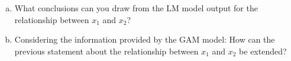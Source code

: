{\begin{enumerate}[a)]
	\item
    What conclusions can you draw from the LM model output for the relationship between $x_1$ and $x_2$? 
    
	\item
    Considering the information provided by the GAM model: How can the previous statement about the relationship between $x_1$ and $x_2$ be extended? 
    
\end{enumerate}

}
